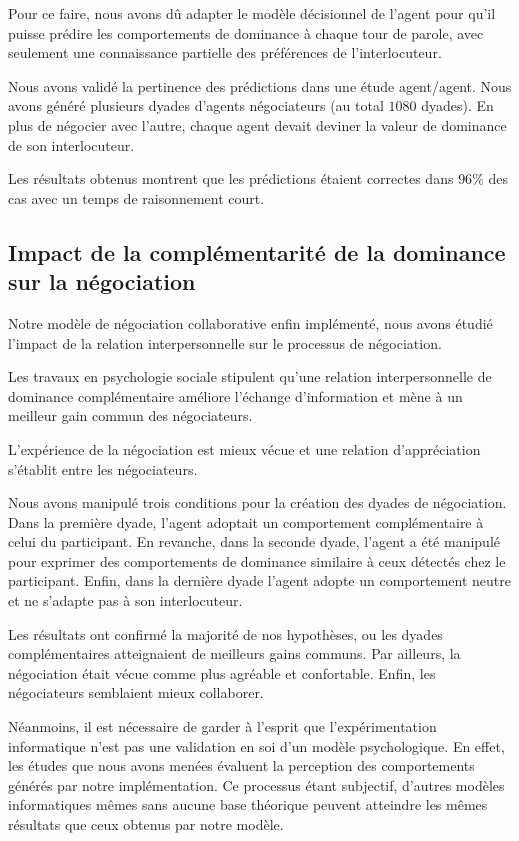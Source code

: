 Pour ce faire, nous avons dû adapter le modèle décisionnel de l'agent pour qu'il puisse prédire les comportements de dominance à chaque tour de parole, avec seulement une connaissance partielle des préférences de l'interlocuteur. 

Nous avons validé la pertinence des prédictions dans une étude agent/agent. Nous avons généré plusieurs dyades d'agents négociateurs (au total $1080$ dyades). En plus de négocier avec l'autre, chaque agent devait deviner la valeur de dominance de son interlocuteur.

Les résultats obtenus montrent que les prédictions étaient correctes dans $96\%$ des cas avec un temps de raisonnement court. 

\subsection{Impact de la complémentarité de la dominance sur la négociation}

Notre modèle de négociation collaborative enfin implémenté, nous avons étudié l'impact de la relation interpersonnelle sur le processus de négociation. 

Les travaux en psychologie sociale stipulent qu’une relation interpersonnelle de dominance complémentaire améliore l’échange    d’information et mène à un meilleur gain commun des négociateurs.

L’expérience de la négociation est mieux vécue et une relation d’appréciation s’établit entre les négociateurs. 

Nous avons manipulé trois conditions pour la création des dyades de négociation. Dans la première dyade, l'agent adoptait un comportement complémentaire à celui du participant. En revanche, dans la seconde dyade, l'agent a été manipulé pour exprimer des comportements de dominance similaire à ceux détectés chez le participant. Enfin, dans la dernière dyade l'agent adopte un comportement neutre et ne s'adapte pas à son interlocuteur.

Les résultats ont confirmé la majorité de nos hypothèses, ou les dyades complémentaires atteignaient de meilleurs gains communs. Par ailleurs,  la négociation était vécue comme plus agréable et confortable. Enfin, les négociateurs semblaient mieux collaborer. 

Néanmoins, il est nécessaire de garder à l’esprit que l’expérimentation informatique n’est pas une validation en soi d’un modèle psychologique. En effet, les études que nous avons menées évaluent la perception des comportements générés par notre implémentation. Ce processus étant subjectif, d'autres modèles informatiques mêmes sans aucune base théorique peuvent atteindre les mêmes résultats que ceux obtenus par notre modèle.

